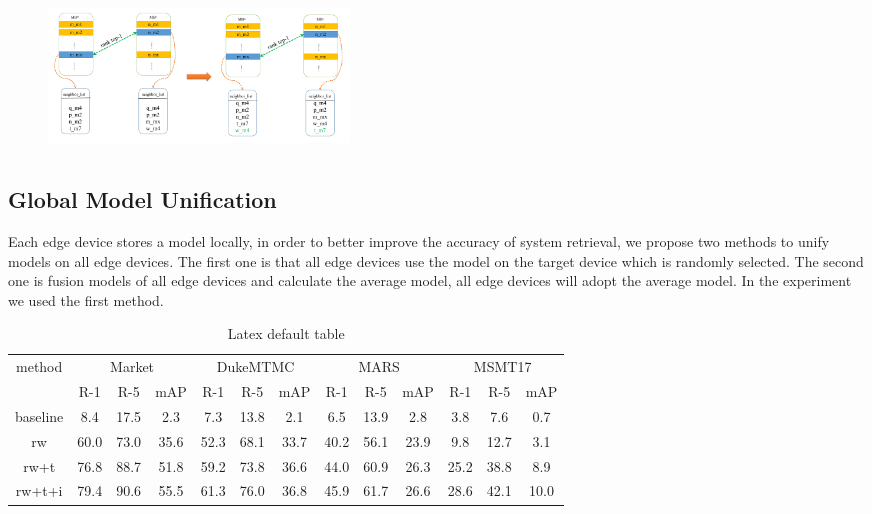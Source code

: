 \documentclass{article}
\begin{document}
\begin{figure}[htb]
    \includegraphics[width=8cm,height=4cm]{fig4_all.pdf}
    \caption{}
    \label{}
\end{figure}




\subsection{Global Model Unification}
Each edge device stores a model locally, in order to better improve the accuracy of system retrieval, we propose two methods to unify models on all edge devices. The first one is that all edge devices use the model on the target device which is randomly selected. The second one is fusion models of all edge devices and calculate the average model, all edge devices will adopt the average model. In the experiment we used the first method.







\renewcommand\arraystretch{1.5}
\begin{table}
\centering
\begin{tabular}{c|c c c|c c c|c c c|c c c}
\hline
\multirow{2}{*}{method} & 
\multicolumn{3}{c|}{Market} & \multicolumn{3}{c|}{DukeMTMC} & \multicolumn{3}{c|}{MARS} & \multicolumn{3}{c}{MSMT17} \\
\cline{2-13} 
& R-1 & R-5 & mAP & R-1 & R-5 & mAP & R-1 & R-5 & mAP & R-1 & R-5 & mAP\\ \hline
\hline
baseline & 8.4   & 17.5  &  2.3 &  7.3 & 13.8  &  2.1  &  6.5  & 13.9  &  2.8  & 3.8   & 7.6    &  0.7  \\
rw       & 60.0  & 73.0  & 35.6 & 52.3 & 68.1  & 33.7  & 40.2  & 56.1  & 23.9  & 9.8   & 12.7   &  3.1  \\
rw+t     & 76.8  & 88.7  & 51.8 & 59.2 & 73.8  & 36.6  & 44.0  & 60.9  & 26.3  & 25.2  & 38.8   &  8.9  \\
rw+t+i   & 79.4  & 90.6  & 55.5 & 61.3 & 76.0  & 36.8  & 45.9  & 61.7  & 26.6  & 28.6  & 42.1   &  10.0  \\
\hline
\end{tabular}
\caption{Latex default table}
\label{tab:plain}
\end{table}
\end{document}
